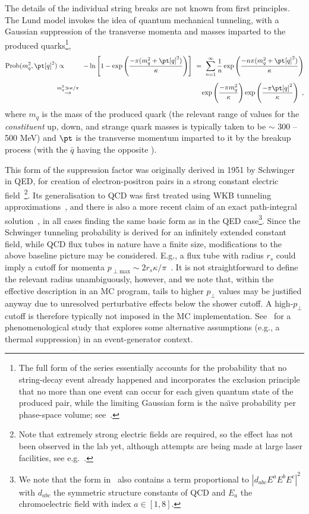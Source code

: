 %
%
The details of the individual string breaks 
are not known from first principles. The
Lund model invokes the idea of quantum mechanical tunneling, with a Gaussian suppression of the transverse momenta and masses imparted to
the produced quarks\footnote{The full form of the series essentially accounts for the probability that no string-decay event already happened and incorporates the exclusion principle that no more than one event can occur for each given quantum state of the produced pair, while the limiting Gaussian form is the na\"\i ve probability per phase-space volume; see~\cite{Casher:1978wy}.}, 
\begin{eqnarray}
\mathrm{Prob}(m_q^2,\pt[q]^2)&\propto&-\ln\left[1-\exp\left(\frac{-\pi
    (m_q^2 + \pt[q]^2)}{\kappa}\right) \right]  ~= ~
\sum_{n=1}^{\infty} \frac{1}{n} \exp\left(\frac{-n \pi (
    m_q^2 + \pt[q]^2 ) }{\kappa}\right) \nonumber
\\[2mm]
& \!\!\stackrel{m_q^2 \gg \kappa/\pi}{\to}\!\! & \exp\left(\frac{-\pi
    m_q^2}{\kappa}\right)\exp\left( \frac{-\pi \pt[q]^2}{\kappa}\right)
~, \label{eq:tunneling}
\end{eqnarray}
where $m_q$ is the mass of the produced quark (the relevant range of values for the \emph{constituent} up, down, and strange quark masses is typically taken to be $\sim$ 300 -- 500 MeV) and $\pt$ is the transverse momentum imparted to it by the breakup process (with the $\bar{q}$ having the opposite
\pt).

%
This form of the suppression factor was originally derived in 1951 by Schwinger in QED, for creation of electron-positron pairs in a strong constant electric field~\cite{Schwinger:1951nm}\footnote{Note that extremely strong electric fields are required, so the effect has not been observed in the lab yet, although attempts are being made at large laser facilities, see e.g.~\cite{Dunne:2008kc}.}. Its generalisation to QCD was first treated using WKB tunneling approximations~\cite{Casher:1978wy,Glendenning:1983qq}, and there is also a more recent claim of an exact path-integral solution~\cite{Nayak:2005pf}, in all cases finding the same basic form as in the QED case\footnote{We note that the form in~\cite{Nayak:2005pf} also contains a term proportional to $|d_{abc}E^aE^bE^c|^2$ with $d_{abc}$ the symmetric structure constants of QCD and $E_a$ the chromoelectric field with index $a\in[1,8]$.}. Since the Schwinger tunneling probability is derived for an infinitely extended constant field, while QCD flux tubes in nature have a finite size, modifications to the above baseline picture may be considered. E.g., a flux tube with radius $r_s$ could imply a cutoff for momenta $p_{\perp \mathrm{max}} \sim 2 r_s \kappa/\pi$~\cite{Casher:1978wy}. It is not straightforward to define the relevant radius unambiguously, however, and we note that, within the effective description in an MC program, tails to higher $p_\perp$ values may be justified anyway due to unresolved perturbative effects below the shower cutoff. A high-$p_\perp$ cutoff is therefore typically not imposed in the MC implementation.
See~\cite{Fischer:2016zzs} for a phenomenological study that explores some alternative assumptions (e.g., a thermal suppression) in an event-generator context.  

